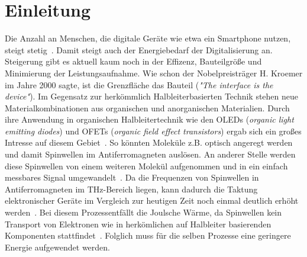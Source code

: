 \chapter{Einleitung}
    Die Anzahl an Menschen, die digitale Geräte wie etwa ein Smartphone nutzen, steigt stetig~\cite{Statista}.
    Damit steigt auch der Energiebedarf der Digitalisierung an.
    Steigerung gibt es aktuell kaum noch in der Effizenz, Bauteilgröße und Minimierung der Leistungsaufnahme.
    Wie schon der Nobelpreisträger H. Kroemer im Jahre 2000 sagte, ist die Grenzfläche das Bauteil (\textit{"The interface is the device"}).
    Im Gegensatz zur herkömmlich Halbleiterbasierten Technik stehen neue Materialkombinationen aus organischen und anorganischen Materialien.
    Durch ihre Anwendung in organischen Halbleitertechnik wie den OLEDs (\textit{organic light emitting diodes}) und OFETs (\textit{organic field effect transistors}) ergab sich ein großes Intresse auf diesem Gebiet~\cite{Uni-Tübingen}.
    So könnten Moleküle z.B. optisch angeregt werden und damit Spinwellen im Antiferromagneten auslösen. 
    An anderer Stelle werden diese Spinwellen von einem weiteren Molekül aufgenommen und in ein einfach messbares Signal umgewandelt~\cite{SINFONIA}.
    Da die Frequenzen von Spinwellen in Antiferromagneten im \si{\tera\hertz}-Bereich liegen, kann dadurch die Taktung elektronischer Geräte im Vergleich zur heutigen Zeit noch einmal deutlich erhöht werden~\cite{AFM_5}.
    Bei diesem Prozessentfällt die Joulsche Wärme, da Spinwellen kein Transport von Elektronen wie in herkömlichen auf Halbleiter basierenden Komponenten stattfindet~\cite{AFM_3}.
    Folglich muss für die selben Prozesse eine geringere Energie aufgewendet werden.
   
